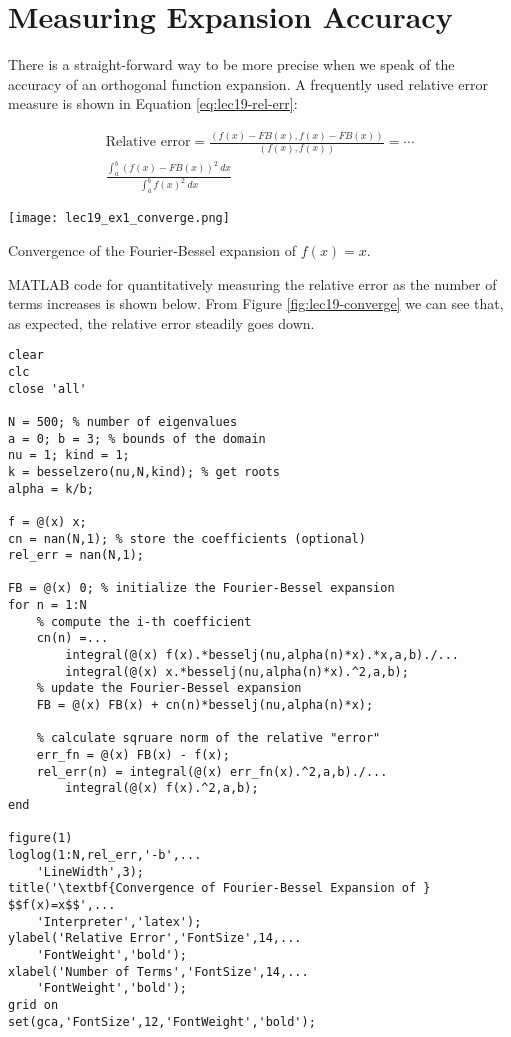\section{Measuring Expansion Accuracy}
There is a straight-forward way to be more precise when we speak of the accuracy of an orthogonal function expansion.  A frequently used relative error measure is shown in Equation \ref{eq:lec19-rel-err}:

\begin{multline}
\text{Relative error} = \frac{\left(f(x) - FB(x), f(x)-FB(x)\right)}{\left(f(x),f(x)\right)} = \cdots \\ \frac{\int_a^b \left(f(x)-FB(x)\right)^2 \ dx}{\int_a^b f(x)^2 \ dx}
\label{eq:lec19-rel-err}
\end{multline}
\begin{marginfigure}
\texttt{[image: lec19\_ex1\_converge.png]}
\caption{Convergence of the Fourier-Bessel expansion of $f(x)=x$.}
\label{fig:lec19-converge}
\end{marginfigure}
MATLAB code for quantitatively measuring the relative error as the number of terms increases is shown below.  From Figure \ref{fig:lec19-converge} we can see that, as expected, the relative error steadily goes down. 
\begin{lstlisting}[name=lec19-converge,style=myMatlab]
clear
clc
close 'all'

N = 500; % number of eigenvalues
a = 0; b = 3; % bounds of the domain
nu = 1; kind = 1;
k = besselzero(nu,N,kind); % get roots
alpha = k/b;

f = @(x) x; 
cn = nan(N,1); % store the coefficients (optional)
rel_err = nan(N,1); 

FB = @(x) 0; % initialize the Fourier-Bessel expansion
for n = 1:N
    % compute the i-th coefficient
    cn(n) =...
        integral(@(x) f(x).*besselj(nu,alpha(n)*x).*x,a,b)./...
        integral(@(x) x.*besselj(nu,alpha(n)*x).^2,a,b);
    % update the Fourier-Bessel expansion
    FB = @(x) FB(x) + cn(n)*besselj(nu,alpha(n)*x);

    % calculate sqruare norm of the relative "error"
    err_fn = @(x) FB(x) - f(x); 
    rel_err(n) = integral(@(x) err_fn(x).^2,a,b)./...
        integral(@(x) f(x).^2,a,b); 
end

figure(1)
loglog(1:N,rel_err,'-b',...
    'LineWidth',3);
title('\textbf{Convergence of Fourier-Bessel Expansion of } $$f(x)=x$$',...
    'Interpreter','latex');
ylabel('Relative Error','FontSize',14,...
    'FontWeight','bold');
xlabel('Number of Terms','FontSize',14,...
    'FontWeight','bold');
grid on
set(gca,'FontSize',12,'FontWeight','bold');
\end{lstlisting}


